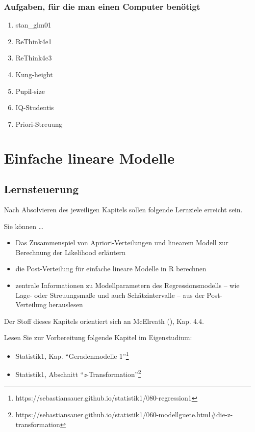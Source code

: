 \documentclass[
  ngerman,
  letterpaper,
  twoside,
  open=any]{scrbook}
\providecommand{\tightlist}{%
  \setlength{\itemsep}{0pt}\setlength{\parskip}{0pt}}\usepackage{longtable,booktabs,array}
\theoremstyle{definition}
\theoremstyle{plain}
\theoremstyle{definition}
\theoremstyle{definition}
\theoremstyle{definition}
\theoremstyle{definition}
\theoremstyle{remark}
\begin{document}
\subsection{Aufgaben, für die man einen Computer
benötigt}\label{aufgaben-fuxfcr-die-man-einen-computer-benuxf6tigt}

\begin{enumerate}
\def\labelenumi{\arabic{enumi}.}
\tightlist
\item
  stan\_glm01
\item
  ReThink4e1
\item
  ReThink4e3
\item
  Kung-height
\item
  Pupil-size
\item
  IQ-Studentis
\item
  Priori-Streuung
\end{enumerate}

\chapter{Einfache lineare Modelle}\label{einfache-lineare-modelle}

\section{Lernsteuerung}\label{lernsteuerung-8}

Nach Absolvieren des jeweiligen Kapitels sollen folgende Lernziele
erreicht sein.

Sie können \ldots{}

\begin{itemize}
\tightlist
\item
  Das Zusammenspiel von Apriori-Verteilungen und linearem Modell zur
  Berechnung der Likelihood erläutern
\item
  die Post-Verteilung für einfache lineare Modelle in R berechnen
\item
  zentrale Informationen zu Modellparametern des Regressionsmodells --
  wie Lage- oder Streuungsmaße und auch Schätzintervalle -- aus der
  Post-Verteilung herauslesen
\end{itemize}

Der Stoff dieses Kapitels orientiert sich an McElreath
(), Kap. 4.4.

Lesen Sie zur Vorbereitung folgende Kapitel im Eigenstudium:

\begin{itemize}
\tightlist
\item
  Statistik1, Kap. \enquote{Geradenmodelle 1}\footnote{https://sebastiansauer.github.io/statistik1/080-regression1}
\item
  Statistik1, Abschnitt \enquote{\emph{z}-Transformation}\footnote{https://sebastiansauer.github.io/statistik1/060-modellguete.html\#die-z-transformation}
\end{itemize}
\end{document}
